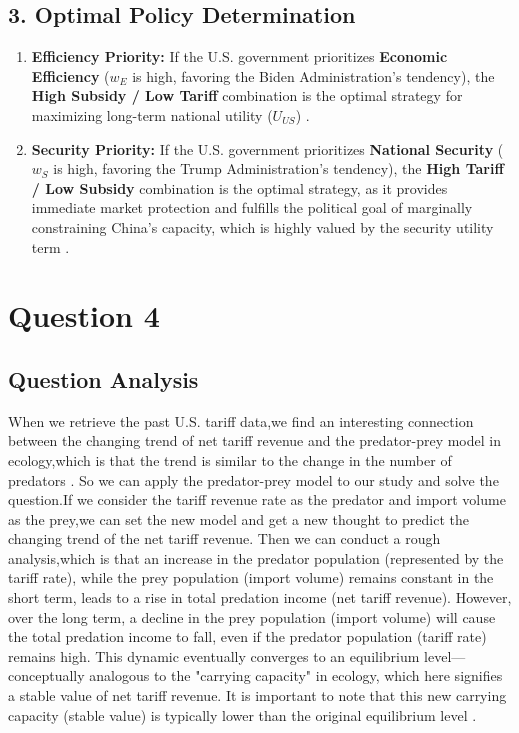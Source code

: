 \documentclass{apmcmthesis}
\begin{document}
\subsection*{3. Optimal Policy Determination}

\begin{enumerate}
    \item \textbf{Efficiency Priority:} If the U.S. government prioritizes \textbf{Economic Efficiency} ($w_E$ is high, favoring the Biden Administration's tendency), the \textbf{High Subsidy / Low Tariff} combination is the optimal strategy for maximizing long-term national utility ($U_{US}$) \cite{nist2025chips}.
    \item \textbf{Security Priority:} If the U.S. government prioritizes \textbf{National Security} ($w_S$ is high, favoring the Trump Administration's tendency), the \textbf{High Tariff / Low Subsidy} combination is the optimal strategy, as it provides immediate market protection and fulfills the political goal of marginally constraining China's capacity, which is highly valued by the security utility term \cite{whitehouse2025reciprocal}.
\end{enumerate}
\section{Question 4}
\subsection{Question Analysis}
When we retrieve the past U.S. tariff data,we find an interesting connection between the changing trend of net tariff revenue and the predator-prey model in ecology,which is that the trend is similar to the change in the number of predators \cite{ustreasury2025fiscal}.
So we can apply the predator-prey model to our study and solve the question.If we consider the tariff revenue rate as the predator and import volume as the prey,we can set the new model and get a new thought to predict the changing trend of the net tariff revenue.
Then we can conduct a rough analysis,which is that an increase in the predator population (represented by the tariff rate), while the prey population (import volume) remains constant in the short term, leads to a rise in total predation income (net tariff revenue). However, over the long term, a decline in the prey population (import volume) will cause the total predation income to fall, even if the predator population (tariff rate) remains high. This dynamic eventually converges to an equilibrium level—conceptually analogous to the "carrying capacity" in ecology, which here signifies a stable value of net tariff revenue. It is important to note that this new carrying capacity (stable value) is typically lower than the original equilibrium level \cite{cbo2025budget}.
\end{document}
